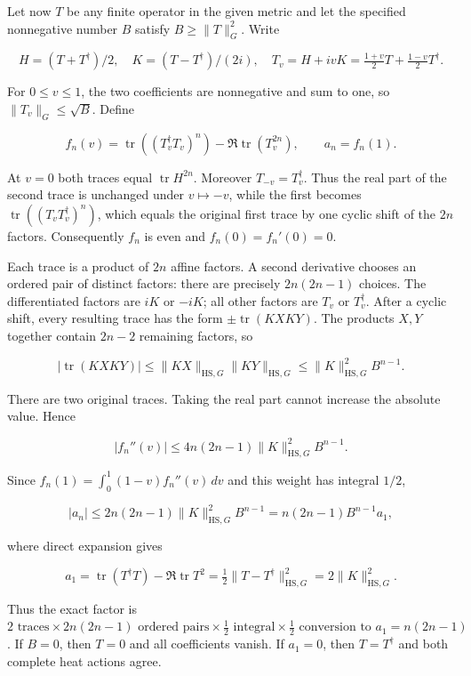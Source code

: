Let now \(T\) be any finite operator in the given metric and let the specified nonnegative number \(B\) satisfy \(B\ge\|T\|_G^2\). Write

\[
H=(T+T^\dagger)/2,\quad K=(T-T^\dagger)/(2i),\quad
T_v=H+ivK=\tfrac{1+v}{2}T+\tfrac{1-v}{2}T^\dagger.
\]

For \(0\le v\le1\), the two coefficients are nonnegative and sum to one, so \(\|T_v\|_G\le\sqrt B\). Define

\[
f_n(v)=\operatorname{tr}((T_v^\dagger T_v)^n)
-\Re\operatorname{tr}(T_v^{2n}),\qquad a_n=f_n(1).
\]

At \(v=0\) both traces equal \(\operatorname{tr}H^{2n}\). Moreover \(T_{-v}=T_v^\dagger\). Thus the real part of the second trace is unchanged under \(v\mapsto-v\), while the first becomes \(\operatorname{tr}((T_vT_v^\dagger)^n)\), which equals the original first trace by one cyclic shift of the \(2n\) factors. Consequently \(f_n\) is even and \(f_n(0)=f_n'(0)=0\).

Each trace is a product of \(2n\) affine factors. A second derivative chooses an ordered pair of distinct factors: there are precisely \(2n(2n-1)\) choices. The differentiated factors are \(iK\) or \(-iK\); all other factors are \(T_v\) or \(T_v^\dagger\). After a cyclic shift, every resulting trace has the form \(\pm\operatorname{tr}(KXKY)\). The products \(X,Y\) together contain \(2n-2\) remaining factors, so

\[
|\operatorname{tr}(KXKY)|
\le\|KX\|_{\mathrm{HS},G}\|KY\|_{\mathrm{HS},G}
\le\|K\|_{\mathrm{HS},G}^2 B^{n-1}.
\]

There are two original traces. Taking the real part cannot increase the absolute value. Hence

\[
|f_n''(v)|\le4n(2n-1)\|K\|_{\mathrm{HS},G}^2B^{n-1}.
\]

Since \(f_n(1)=\int_0^1(1-v)f_n''(v)\,dv\) and this weight has integral \(1/2\),

\[
|a_n|\le2n(2n-1)\|K\|_{\mathrm{HS},G}^2B^{n-1}
=n(2n-1)B^{n-1}a_1, \tag{ID3.1}
\]

where direct expansion gives

\[
a_1=\operatorname{tr}(T^\dagger T)-\Re\operatorname{tr}T^2
=\tfrac12\|T-T^\dagger\|_{\mathrm{HS},G}^2
=2\|K\|_{\mathrm{HS},G}^2. \tag{ID3.2}
\]

Thus the exact factor is \(2\text{ traces}\times2n(2n-1)\text{ ordered pairs}\times
\tfrac12\text{ integral}\times\tfrac12\text{ conversion to }a_1
=n(2n-1)\). If \(B=0\), then \(T=0\) and all coefficients vanish. If \(a_1=0\), then \(T=T^\dagger\) and both complete heat actions agree.

